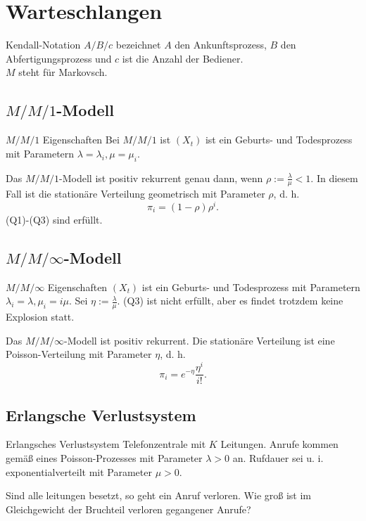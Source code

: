 \section{Warteschlangen}

\begin{karte}{Kendall-Notation}
    \(A/B/c\) bezeichnet \(A\) den Ankunftsprozess, 
    \(B\) den Abfertigungsprozess und \(c\) ist die Anzahl 
    der Bediener.\\
    \(M\) steht für Markovsch. 
\end{karte}

\subsection*{\(M/M/1\)-Modell}

\begin{karte}{\(M/M/1\) Eigenschaften}
    Bei \(M/M/1\) ist \((X_t)\) ist ein Geburts- und Todesprozess 
    mit Parametern \(\lambda = \lambda_i, \mu = \mu_i\).
    
    Das \(M/M/1\)-Modell ist positiv rekurrent 
    genau dann, wenn \(\rho := \frac{\lambda}{\mu} < 1\).
    In diesem Fall ist die stationäre Verteilung geometrisch 
    mit Parameter \(\rho\), d. h. 
    \[ \pi_i = (1-\rho) \rho^i. \]
    (Q1)-(Q3) sind erfüllt.
\end{karte}

\subsection*{\(M/M/\infty\)-Modell}

\begin{karte}{\(M/M/\infty\) Eigenschaften}
    \((X_t)\) ist ein Geburts- und Todesprozess 
    mit Parametern \(\lambda_i = \lambda, 
    \mu_i = i \mu\).
    Sei \(\eta := \frac{\lambda}{\mu}\).
    (Q3) ist nicht erfüllt, aber es findet trotzdem keine 
    Explosion statt.

    Das \(M/M/\infty\)-Modell ist positiv rekurrent. 
    Die stationäre Verteilung ist eine Poisson-Verteilung 
    mit Parameter \(\eta\), d. h. 
    \[ \pi_i = e^{-\eta} \frac{\eta^i}{i!}. \]
\end{karte}

\subsection*{Erlangsche Verlustsystem}

\begin{karte}{Erlangsches Verlustsystem}
    Telefonzentrale mit \(K\) Leitungen. 
    Anrufe kommen gemäß eines Poisson-Prozesses mit 
    Parameter \(\lambda > 0\) an. Rufdauer sei u. i. exponentialverteilt 
    mit Parameter \(\mu > 0\).

    Sind alle leitungen besetzt, so geht ein Anruf verloren.
    Wie groß ist im Gleichgewicht der Bruchteil verloren 
    gegangener Anrufe?
\end{karte}

